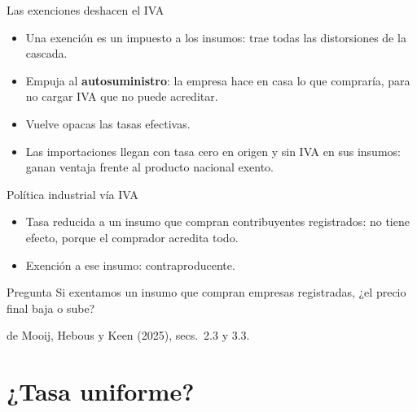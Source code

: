 \documentclass[aspectratio=169,11pt]{beamer}
\newcommand{\fuente}[1]{\par\vfill{\small\color{cGris}#1\par}}
\begin{document}
\begin{frame}{Las exenciones deshacen el IVA}
  \begin{itemize}
    \item Una exención es un impuesto a los insumos: trae todas las distorsiones de la cascada.
    \item Empuja al \textbf{autosuministro}: la empresa hace en casa lo que compraría, para no cargar IVA que no puede acreditar.
    \item Vuelve opacas las tasas efectivas.
    \item Las importaciones llegan con tasa cero en origen y sin IVA en sus insumos: ganan ventaja frente al producto nacional exento.
  \end{itemize}
  \pause
  \begin{block}{Política industrial vía IVA}
    \begin{itemize}
      \item Tasa reducida a un insumo que compran contribuyentes registrados: no tiene efecto, porque el comprador acredita todo.
      \item Exención a ese insumo: contraproducente.
    \end{itemize}
  \end{block}
  \pause
  \begin{alertblock}{Pregunta}
    Si exentamos un insumo que compran empresas registradas, ¿el precio final baja o sube?
  \end{alertblock}
  \fuente{de Mooij, Hebous y Keen (2025), secs.~2.3 y 3.3.}
\end{frame}

\section{¿Tasa uniforme?}
\end{document}
